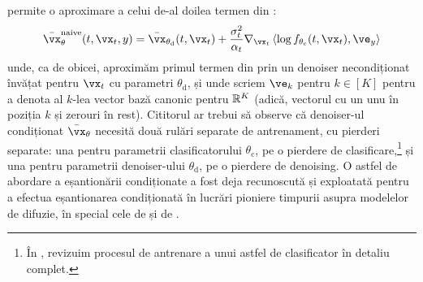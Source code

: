 \documentclass[../../book-main_ro.tex]{subfiles}
\begin{document}
permite o aproximare a celui de-al doilea termen din
:
\begin{equation}\label{eq:conditional-denoising-mmse-denoiser-paired-data-approx}
  \bar{\vx}_{\theta}^{\mathrm{naive}}(t, \vx_t, y)
  =
  \bar{\vx}_{\theta_{\mathrm{d}}}(t, \vx_t)
  + \frac{\sigma_t^2}{\alpha_t}
  \nabla_{\vx_t}
  \ip*{
    \log f_{\theta_{\mathrm{c}}}(t, \vx_t)
  }{
    \ve_{y}
  }
\end{equation}
unde, ca de obicei, aproximăm primul termen din
 prin un denoiser
necondiționat învățat pentru $\vx_t$ cu parametri $\theta_{\mathrm{d}}$, și
unde scriem $\ve_k$ pentru $k \in [K]$ pentru a denota al $k$-lea vector bază
canonic pentru $\mathbb{R}^K$ (adică, vectorul cu
un unu în poziția $k$ și zerouri în rest).
Cititorul ar trebui să observe că denoiser-ul condiționat $\bar{\vx}_{\theta}$
necesită două rulări separate de antrenament, cu pierderi separate: una pentru parametrii
clasificatorului $\theta_{\mathrm{c}}$, pe o pierdere de
clasificare,\footnote{În , revizuim procesul de antrenare a unui astfel
de clasificator în detaliu complet.} și una pentru parametrii denoiser-ului
$\theta_{\mathrm{d}}$, pe o pierdere de denoising. O astfel de abordare a eșantionării
condiționate a fost deja recunoscută și exploatată pentru a efectua eșantionarea condiționată în
lucrări pioniere timpurii asupra modelelor de difuzie, în special cele de
\citet{Sohl-Dickstein2015} și de \citet{song2020score}.
\end{document}

